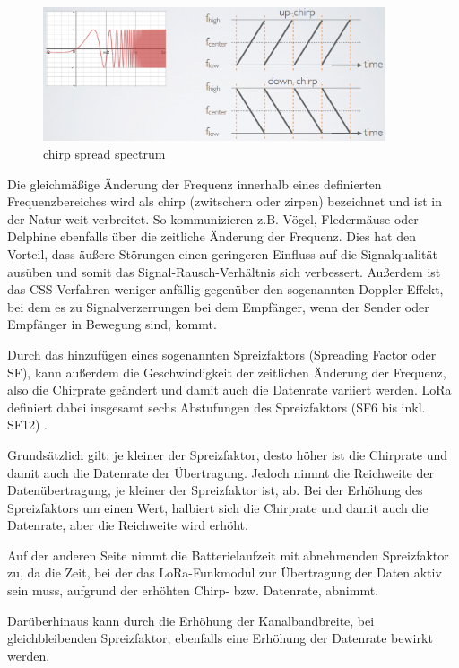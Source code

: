\begin{figure}[h]
 \centering
 \includegraphics[width=0.9\textwidth]{pictures/chirp-sf}
 \caption[chirp spread spectrum]{chirp spread spectrum \cite{lora2022}}
 \label{fig:css}
\end{figure}

Die gleichmäßige Änderung der Frequenz innerhalb eines definierten Frequenzbereiches wird als chirp (zwitschern oder zirpen) bezeichnet und ist in der Natur weit verbreitet. So kommunizieren z.B. Vögel, Fledermäuse oder Delphine ebenfalls über die zeitliche Änderung der Frequenz. Dies hat den Vorteil, dass äußere Störungen einen geringeren Einfluss auf die Signalqualität ausüben und somit das Signal-Rausch-Verhältnis sich verbessert. Außerdem ist das CSS Verfahren weniger anfällig gegenüber den sogenannten Doppler-Effekt, bei dem es zu Signalverzerrungen bei dem Empfänger, wenn der Sender oder Empfänger in Bewegung sind, kommt. 

Durch das hinzufügen eines sogenannten Spreizfaktors (Spreading Factor oder SF), kann außerdem die Geschwindigkeit der zeitlichen Änderung der Frequenz, also die Chirprate geändert und damit auch die Datenrate variiert werden. LoRa definiert dabei insgesamt sechs Abstufungen des Spreizfaktors (SF6 bis inkl. SF12) \cite{sf2022}.

Grundsätzlich gilt; je kleiner der Spreizfaktor, desto höher ist die Chirprate und damit auch die Datenrate der Übertragung. Jedoch nimmt die Reichweite der Datenübertragung, je kleiner der Spreizfaktor ist, ab. Bei der Erhöhung des Spreizfaktors um einen Wert, halbiert sich die Chirprate und damit auch die Datenrate, aber die Reichweite wird erhöht. 

Auf der anderen Seite nimmt die Batterielaufzeit mit abnehmenden Spreizfaktor zu, da die Zeit, bei der das LoRa-Funkmodul zur Übertragung der Daten aktiv sein muss, aufgrund der erhöhten Chirp- bzw. Datenrate, abnimmt. 

Darüberhinaus kann durch die Erhöhung der Kanalbandbreite, bei gleichbleibenden Spreizfaktor, ebenfalls eine Erhöhung der Datenrate bewirkt werden. 

